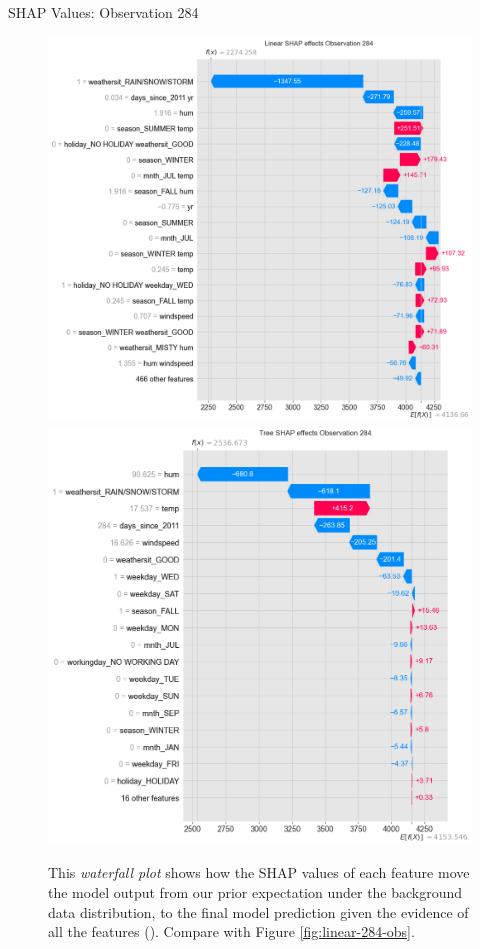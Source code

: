 \documentclass[10pt]{beamer}
\begin{document}
\begin{frame}{SHAP Values: Observation 284}
\begin{center}
  \begin{figure}
    \includegraphics[scale=0.19]{images/interpretable_ml_132_0.png}
    \includegraphics[scale=0.19]{images/interpretable_ml_146_0.png}
    \caption{This {\em waterfall plot} shows how the SHAP values of each feature move the model output from our prior expectation under the background data distribution, to the final model prediction given the evidence of all the features (\cite{NIPS2017_7062}). Compare with Figure \ref{fig:linear-284-obs}.}
  \end{figure}
\end{center}
\end{frame}
\end{document}
